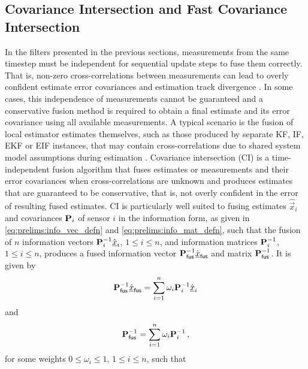 \subsection{Covariance Intersection and Fast Covariance Intersection}\label{subsec:prelims:fci}
In the filters presented in the previous sections, measurements from the same timestep must be independent for sequential update steps to fuse them correctly. That is, non-zero cross-correlations between measurements can lead to overly confident estimate error covariances and estimation track divergence \cite{bar-shalomTracktotrackCorrelationProblem1981,sunMultisensorOptimalInformation2004}. In some cases, this independence of measurements cannot be guaranteed and a conservative fusion method is required to obtain a final estimate and its error covariance using all available measurements. A typical scenario is the fusion of local estimator estimates themselves, such as those produced by separate KF, IF, EKF or EIF instances, that may contain cross-correlations due to shared system model assumptions during estimation \cite{wangDistributedEstimationFusion2012,radtkeDistributedEstimationUsing2019,ajglInverseCovarianceIntersection2020}. Covariance intersection (CI) is a time-independent fusion algorithm that fuses estimates or measurements and their error covariances when cross-correlations are unknown \cite{julierNondivergentEstimationAlgorithm1997} and produces estimates that are guaranteed to be conservative, that is, not overly confident in the error of resulting fused estimates. CI is particularly well suited to fusing estimates $\hat{\vec{x}}_i$ and covariances ${{\mathbf{P}}}_i$ of sensor $i$ in the information form, as given in \eqref{eq:prelims:info_vec_defn} and \eqref{eq:prelims:info_mat_defn}, such that the fusion of $n$ information vectors ${{\mathbf{P}}}_i^{-1}\hat{{\underline{x}}}_i$, $1\leq i\leq n$, and information matrices ${{\mathbf{P}}}_i^{-1}$, $1\leq i\leq n$, produces a fused information vector ${{\mathbf{P}}}_{\mathsf{fus}}^{-1}\hat{{\underline{x}}}_{\mathsf{fus}}$ and matrix ${{\mathbf{P}}}_{\mathsf{fus}}^{-1}$. It is given by
\begin{equation}\label{eq:prelims:ci_info_vec}
    {\ensuremath{{\mathbf{P}}}}_{\mathsf{fus}}^{-1}\hat{{\underline{x}}}_{\mathsf{fus}} = \sum_{i=1}^n \omega_i {{\mathbf{P}}}_i^{-1} \hat{{\underline{x}}}_i
\end{equation}
and
\begin{equation}\label{eq:prelims:ci_info_mat}
{\ensuremath{{\mathbf{P}}}}_{\mathsf{fus}}^{-1}=\sum_{i=1}^{n}\omega_i {{\mathbf{P}}}_i^{-1}\,,
\end{equation}
for some weights $0\leq \omega_i \leq 1$, $1\leq i \leq n$, such that
